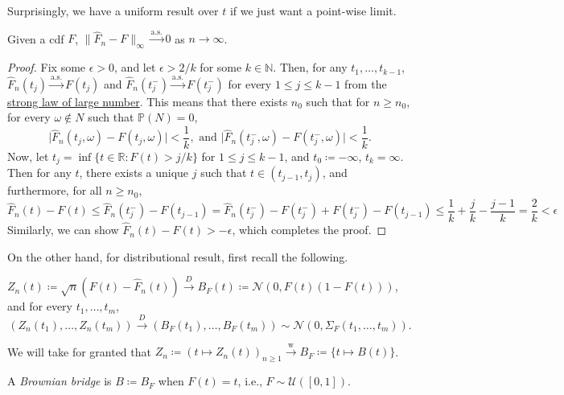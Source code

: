 Surprisingly, we have a uniform result over \(t\) if we just want a point-wise limit.

\begin{theorem}\label{thm:Glivenko-Cantelli}
	Given a cdf \(F\), \(\lVert \hat{F} _n - F \rVert _\infty \overset{\text{a.s.} }{\to} 0\) as \(n \to \infty \).
\end{theorem}
\begin{proof}
	Fix some \(\epsilon > 0\), and let \(\epsilon > 2 / k\) for some \(k \in \mathbb{N} \). Then, for any \(t_1, \dots , t_{k-1}\), \(\hat{F} _n (t_j) \overset{\text{a.s.} }{\to } F(t_j)\) and \(\hat{F} _n(t_j^-) \overset{\text{a.s.} }{\to} F(t_j^-)\) for every \(1 \leq j \leq k-1\) from the \hyperref[thm:SLLN]{strong law of large number}. This means that there exists \(n_0\) such that for \(n \geq n_0\), for every \(\omega \notin N\) such that \(\mathbb{P} (N) = 0\),
	\[
		\vert \hat{F} _n(t_j, \omega ) - F(t_j, \omega ) \vert < \frac{1}{k} ,\text{ and }
		\vert \hat{F} _n(t_j^-, \omega ) - F(t_j^-, \omega ) \vert < \frac{1}{k}.
	\]
	Now, let \(t_j = \inf \{ t \in \mathbb{R} \colon F(t) > j / k \}\) for \(1 \leq j \leq k-1\), and \(t_0 \coloneqq -\infty \), \(t_k = \infty \). Then for any \(t\), there exists a unique \(j\) such that \(t \in (t_{j-1}, t_j)\), and furthermore, for all \(n \geq n_0\),
	\[
		\hat{F} _n(t) - F(t)
		\leq \hat{F} _n(t_j^-) - F(t_{j-1})
		= \hat{F} _n(t_j^-) - F(t_j^-) + F(t_j^-) - F(t_{j-1})
		\leq \frac{1}{k} + \frac{j}{k} - \frac{j-1}{k}
		= \frac{2}{k}
		< \epsilon
	\]
	Similarly, we can show \(\hat{F} _n(t) - F(t) > - \epsilon \), which completes the proof.
\end{proof}

On the other hand, for distributional result, first recall the following.

\begin{prev}
	\(Z_n(t) \coloneqq \sqrt{n} (F(t) - \hat{F} _n(t)) \overset{D}{\to} B_F(t) \coloneqq \mathcal{N} (0, F(t) (1 - F(t)))\), and for every \(t_1, \dots , t_m\),
	\[
		(Z_n(t_1), \dots , Z_n(t_m)) \overset{D}{\to} (B_F(t_1), \dots , B_F(t_m)) \sim \mathcal{N} (0, \Sigma _F(t_1, \dots , t_m)).
	\]
\end{prev}

We will take for granted that \(Z_n \coloneqq (t \mapsto Z_n(t))_{n \geq 1} \overset{\text{w} }{\to} B_F \coloneqq \{ t \mapsto B(t) \} \).

\begin{definition}\label{def:Brownian-bridge}
	A \emph{Brownian bridge} is \(B \coloneqq B_F\) when \(F(t) = t\), i.e., \(F \sim \mathcal{U} ([0, 1])\).
\end{definition}

